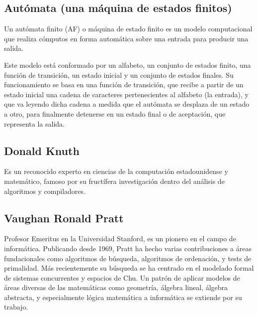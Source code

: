 \subsection{Autómata (una máquina de estados finitos)}
Un autómata finito (AF) o máquina de estado finito es un modelo computacional que realiza cómputos en forma automática sobre una entrada para producir una salida.

Este modelo está conformado por un alfabeto, un conjunto de estados finito, una función de transición, un estado inicial y un conjunto de estados finales. Su funcionamiento se basa en una función de transición, que recibe a partir de un estado inicial una cadena de caracteres pertenecientes al alfabeto (la entrada), y que va leyendo dicha cadena a medida que el autómata se desplaza de un estado a otro, para finalmente detenerse en un estado final o de aceptación, que representa la salida. 

\subsection{Donald Knuth}
Es un reconocido experto en ciencias de la computación estadounidense y matemático, famoso por su fructífera investigación dentro del análisis de algoritmos y compiladores.

\subsection{Vaughan Ronald Pratt}
Profesor Emeritus en la Universidad Stanford, es un pionero en el campo de informática. Publicando desde 1969, Pratt ha hecho varias contribuciones a áreas fundacionales como algoritmos de búsqueda, algoritmos de ordenación, y tests de primalidad. Más recientemente su búsqueda se ha centrado en el modelado formal de sistemas concurrentes y espacios de Chu. Un patrón de aplicar modelos de áreas diversas de las matemáticas como geometría, álgebra lineal, álgebra abstracta, y especialmente lógica matemática a informática se extiende por su trabajo. 